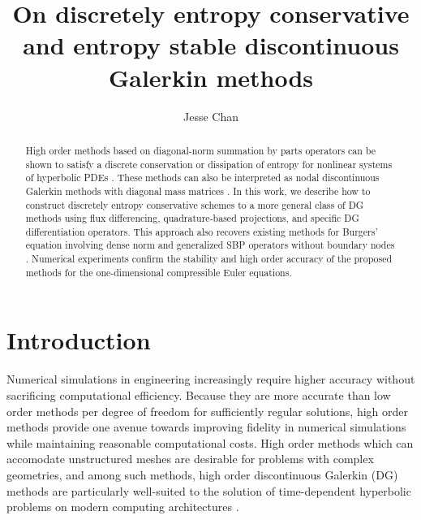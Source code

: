 \documentclass[preprint,10pt]{elsarticle}
\theoremstyle{definition}
\theoremstyle{lemma}
\theoremstyle{theorem}
\theoremstyle{assumption}
\begin{document}

\begin{frontmatter}
\title{On discretely entropy conservative and entropy stable discontinuous Galerkin methods}

\author[rice]{Jesse Chan}
\address[rice]{Department of Computational and Applied Mathematics, Rice University, 6100 Main St, Houston, TX, 77005}

\begin{abstract}
High order methods based on diagonal-norm summation by parts operators can be shown to satisfy a discrete conservation or dissipation of entropy for nonlinear systems of hyperbolic PDEs \cite{fisher2013high, carpenter2014entropy}.  These methods can also be interpreted as nodal discontinuous Galerkin methods with diagonal mass matrices \cite{gassner2016split, gassner2016well, wintermeyer2017entropy, chen2017entropy}.  In this work, we describe how to construct discretely entropy conservative schemes to a more general class of DG methods using flux differencing, quadrature-based projections, and specific DG differentiation operators.  This approach also recovers existing methods for Burgers' equation involving dense norm and generalized SBP operators without boundary nodes \cite{ranocha2016summation, ranocha2017extended}.  Numerical experiments confirm the stability and high order accuracy of the proposed methods for the one-dimensional compressible Euler equations.  
\end{abstract}
\end{frontmatter}


\section{Introduction}

Numerical simulations in engineering increasingly require higher accuracy without sacrificing computational efficiency.  Because they are more accurate than low order methods per degree of freedom for sufficiently regular solutions, high order methods provide one avenue towards improving fidelity in numerical simulations while maintaining reasonable computational costs.  High order methods which can accomodate unstructured meshes are desirable for problems with complex geometries, and among such methods, high order discontinuous Galerkin (DG) methods are particularly well-suited to the solution of time-dependent hyperbolic problems on modern computing architectures \cite{hesthaven2007nodal, klockner2009nodal}.  
\end{document}
